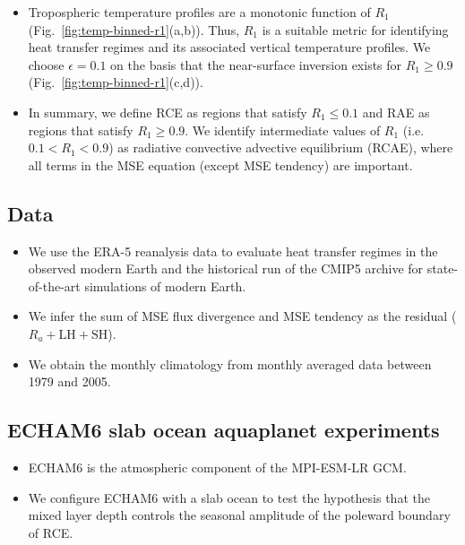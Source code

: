\documentclass{ametsocV5}
\begin{document}
\begin{itemize}
  \item Tropospheric temperature profiles are a monotonic function of $R_{1}$ (Fig.~\ref{fig:temp-binned-r1}(a,b)). Thus, $R_{1}$ is a suitable metric for identifying heat transfer regimes and its associated vertical temperature profiles. We choose $\epsilon=0.1$ on the basis that the near-surface inversion exists for $R_{1} \ge 0.9$ (Fig.~\ref{fig:temp-binned-r1}(c,d)).
  \item In summary, we define RCE as regions that satisfy \(R_{1}\le 0.1\) and RAE as regions that satisfy \(R_{1}\ge 0.9\). We identify intermediate values of \(R_{1}\) (i.e. \(0.1 < R_{1} < 0.9\)) as radiative convective advective equilibrium (RCAE), where all terms in the MSE equation (except MSE tendency) are important.
\end{itemize}

\subsection{Data}
\begin{itemize}
  \item We use the ERA-5 reanalysis data to evaluate heat transfer regimes in the observed modern Earth and the historical run of the CMIP5 archive for state-of-the-art simulations of modern Earth.
  \item We infer the sum of MSE flux divergence and MSE tendency as the residual ($R_{a}+\mathrm{LH+SH}$).
  \item We obtain the monthly climatology from monthly averaged data between 1979 and 2005.
\end{itemize}

\subsection{ECHAM6 slab ocean aquaplanet experiments}
\begin{itemize}
  \item ECHAM6 is the atmospheric component of the MPI-ESM-LR GCM.
  \item We configure ECHAM6 with a slab ocean to test the hypothesis that the mixed layer depth controls the seasonal amplitude of the poleward boundary of RCE.
\end{itemize}

\end{document}
